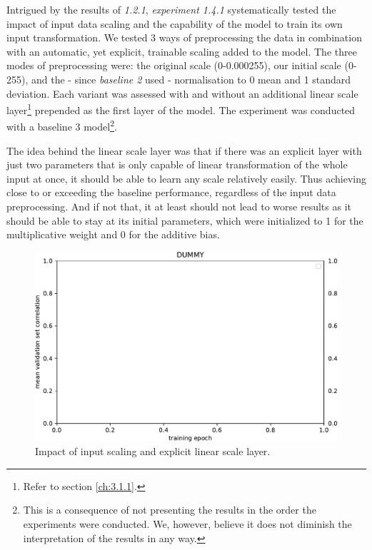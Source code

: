 Intrigued by the results of \textit{1.2.1}, \textit{experiment 1.4.1} systematically tested the impact of input data scaling and the capability of the model to train its own input transformation. We tested 3 ways of preprocessing the data in combination with an automatic, yet explicit, trainable scaling added to the model. The three modes of preprocessing were: the original scale (0-0.000255), our initial scale (0-255), and the - since \textit{baseline 2} used - normalisation to 0 mean and 1 standard deviation. Each variant was assessed with and without an additional linear scale layer\footnote{Refer to section \ref{ch:3.1.1}.} prepended as the first layer of the model. The experiment was conducted with a baseline 3 model\footnote{This is a consequence of not presenting the results in the order the experiments were conducted. We, however, believe it does not diminish the interpretation of the results in any way.}.

The idea behind the linear scale layer was that if there was an explicit layer with just two parameters that is only capable of linear transformation of the whole input at once, it should be able to learn any scale relatively easily. Thus achieving close to or exceeding the baseline performance, regardless of the input data preprocessing. And if not that, it at least should not lead to worse results as it should be able to stay at its initial parameters, which were initialized to 1 for the multiplicative weight and 0 for the additive bias.

\begin{figure}[H]
    \centering
    \includegraphics[width=1\textwidth]{../figures/05_dummy}
    \caption[Experiment 5.1.4.1]{Impact of input scaling and explicit linear scale layer.}
    \label{fig:5.1.4.1}
\end{figure}

